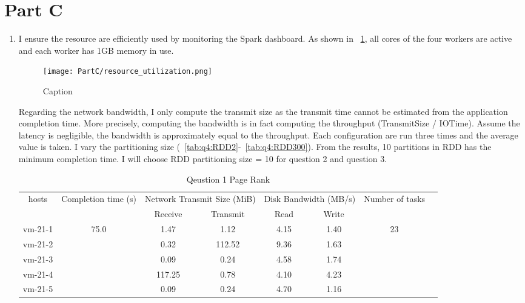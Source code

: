 \section{Part C}

\begin{enumerate}[label=Question \arabic*.]
\item I ensure the resource are efficiently used by monitoring the Spark dashboard. As shown in \figurename~\ref{fig:res_use}, all cores of the four workers are active and each worker has 1GB memory in use.

\begin{figure}
    \centering
    \texttt{[image: PartC/resource\_utilization.png]}
    \caption{Caption}
    \label{fig:res_use}
\end{figure}

Regarding the network bandwidth, I only compute the transmit size as the transmit time cannot be estimated from the application completion time. More precisely, computing the bandwidth is in fact computing the throughput (TransmitSize / IOTime). Assume the latency is negligible, the bandwidth is approximately equal to the throughput. Each configuration are run three times and the average value is taken. I vary the partitioning size (\tablename{~\ref{tab:q4:RDD2}-~\ref{tab:q4:RDD300}}). From the results, 10 partitions in RDD has the minimum completion time. I will choose RDD partitioning size = 10 for question 2 and question 3. 

    \begin{table}[!h]
        \centering
        \begin{tabular}{|c|c|c|c|c|c|c|c|}
        \hline
            \multirow{2}{*}{hosts} & \multirow{2}{*}{Completion time (s)} & \multicolumn{2}{|c|}{Network Transmit Size (MiB)} & \multicolumn{2}{|c|}{Disk Bandwidth (MB/s)} & \multirow{2}{*}{Number of tasks} \\ 
            \cline{3-6}
    & & Receive & Transmit & Read & Write &  \\
        \hline
            vm-21-1 & \multirow{5}{*}{75.0}  & 1.47 & 1.12 & 4.15 & 1.40 & \multirow{5}{*}{23}  \\
            vm-21-2 &  & 0.32 & 112.52 & 9.36 & 1.63 &  \\
            vm-21-3 &  & 0.09 & 0.24 & 4.58 & 1.74 &  \\
            vm-21-4 &  & 117.25 & 0.78 & 4.10 & 4.23 &  \\
            vm-21-5 &  & 0.09 & 0.24 & 4.70 & 1.16 &  \\
        \hline
        \end{tabular}
        \caption{Qeustion 1 Page Rank}
        \label{tab:q1}
    \end{table}
    

\end{enumerate}
